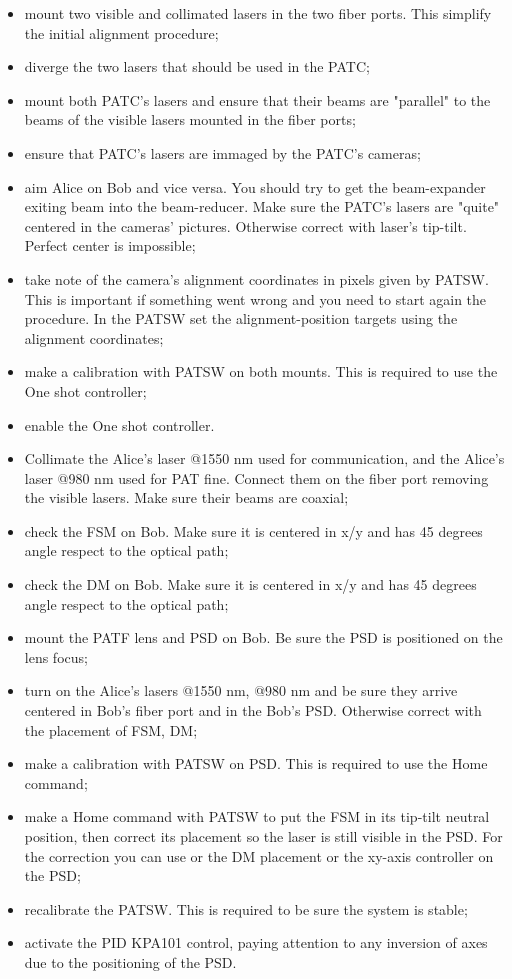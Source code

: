 \begin{itemize}
  \item mount two visible and collimated lasers in the two fiber ports. This simplify the initial alignment procedure;
  \item diverge the two lasers that should be used in the PATC;
  \item mount both PATC's lasers and ensure that their beams are "parallel" to the beams of the visible lasers mounted in the fiber ports;
  \item ensure that PATC's lasers are immaged by the PATC's cameras;
  \item aim Alice on Bob and vice versa. You should try to get the beam-expander exiting beam into the beam-reducer. Make sure the PATC's lasers are "quite" centered in the cameras' pictures. Otherwise correct with laser's tip-tilt. Perfect center is impossible;
  \item take note of the camera's alignment coordinates in pixels given by PATSW. This is important if something went wrong and you need to start again the procedure. In the PATSW set the alignment-position targets using the alignment coordinates;
  \item make a calibration with PATSW on both mounts. This is required to use the One shot controller;
  \item enable the One shot controller.
\end{itemize}

\begin{itemize}
  \item Collimate the Alice's laser @1550 nm used for communication, and the Alice's laser @980 nm used for PAT fine. Connect them on the fiber port removing the visible lasers. Make sure their beams are coaxial;
  \item check the FSM on Bob. Make sure it is centered in x/y and has 45 degrees angle respect to the optical path;
  \item check the DM on Bob. Make sure it is centered in x/y and has 45 degrees angle respect to the optical path;
  \item mount the PATF lens and PSD on Bob. Be sure the PSD is positioned on the lens focus;
  \item turn on the Alice's lasers @1550 nm, @980 nm and be sure they arrive centered in Bob's fiber port and in the Bob's PSD. Otherwise correct with the placement of FSM, DM;
  \item make a calibration with PATSW on PSD. This is required to use the Home command;
  \item make a Home command with PATSW to put the FSM in its tip-tilt neutral position, then correct its placement so the laser is still visible in the PSD. For the correction you can use or the DM placement or the xy-axis controller on the PSD;
  \item recalibrate the PATSW. This is required to be sure the system is stable;
  \item activate the PID KPA101 control, paying attention to any inversion of axes due to the positioning of the PSD.
\end{itemize}

